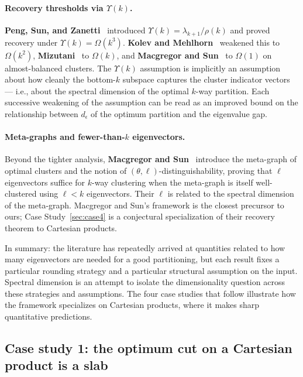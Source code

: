 \documentclass{article}
\theoremstyle{definition}
\theoremstyle{remark}
\begin{document}
\paragraph{Recovery thresholds via $\Upsilon(k)$.} \textbf{Peng, Sun, and Zanetti}~\cite{peng2015partitioning} introduced $\Upsilon(k) = \lambda_{k+1}/\rho(k)$ and proved recovery under $\Upsilon(k) = \Omega(k^3)$. \textbf{Kolev and Mehlhorn}~\cite{kolev2016note} weakened this to $\Omega(k^2)$, \textbf{Mizutani}~\cite{mizutani2021improved} to $\Omega(k)$, and \textbf{Macgregor and Sun}~\cite{macgregor2022tighter} to $\Omega(1)$ on almost-balanced clusters. The $\Upsilon(k)$ assumption is implicitly an assumption about how cleanly the bottom-$k$ subspace captures the cluster indicator vectors --- i.e., about the spectral dimension of the optimal $k$-way partition. Each successive weakening of the assumption can be read as an improved bound on the relationship between $d_\epsilon$ of the optimum partition and the eigenvalue gap.

\paragraph{Meta-graphs and fewer-than-$k$ eigenvectors.} Beyond the tighter analysis, \textbf{Macgregor and Sun}~\cite{macgregor2022tighter} introduce the meta-graph of optimal clusters and the notion of $(\theta, \ell)$-distinguishability, proving that $\ell$ eigenvectors suffice for $k$-way clustering when the meta-graph is itself well-clustered using $\ell < k$ eigenvectors. Their $\ell$ is related to the spectral dimension of the meta-graph. Macgregor and Sun's framework is the closest precursor to ours; Case Study~\ref{sec:case4} is a conjectural specialization of their recovery theorem to Cartesian products.

In summary: the literature has repeatedly arrived at quantities related to how many eigenvectors are needed for a good partitioning, but each result fixes a particular rounding strategy and a particular structural assumption on the input. Spectral dimension is an attempt to isolate the dimensionality question across these strategies and assumptions. The four case studies that follow illustrate how the framework specializes on Cartesian products, where it makes sharp quantitative predictions.

\subsection{Case study 1: the optimum cut on a Cartesian product is a slab}
\label{sec:case1}
\end{document}

